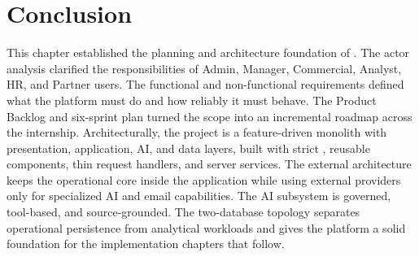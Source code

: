 \section*{Conclusion}
This chapter established the planning and architecture foundation of \projectname{}. The actor analysis clarified the responsibilities of Admin, Manager, Commercial, Analyst, HR, and Partner users. The functional and non-functional requirements defined what the platform must do and how reliably it must behave. The Product Backlog and six-sprint plan turned the scope into an incremental roadmap across the internship. Architecturally, the project is a feature-driven monolith with presentation, application, AI, and data layers, built with strict , reusable components, thin request handlers, and server services. The external architecture keeps the operational core inside the application while using external providers only for specialized AI and email capabilities. The AI subsystem is governed, tool-based, and source-grounded. The two-database topology separates operational persistence from analytical workloads and gives the platform a solid foundation for the implementation chapters that follow.
